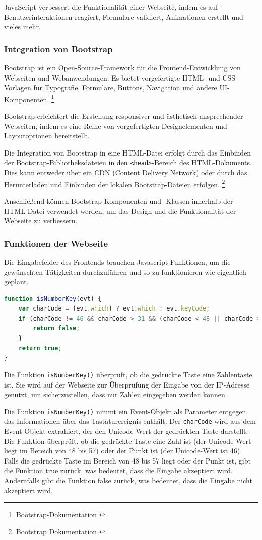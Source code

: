\begin{itemize}
JavaScript verbessert die Funktionalität einer Webseite, indem es auf Benutzerinteraktionen reagiert, Formulare validiert, Animationen erstellt und vieles mehr.

\subsubsection*{Integration von Bootstrap}
Bootstrap ist ein Open-Source-Framework für die Frontend-Entwicklung von Webseiten und Webanwendungen. Es bietet vorgefertigte HTML- und CSS-Vorlagen für Typografie, Formulare, Buttons, Navigation und andere UI-Komponenten. \footnote{Bootstrap-Dokumentation \cite{Bootstrap}}

Bootstrap erleichtert die Erstellung responsiver und ästhetisch ansprechender Webseiten, indem es eine Reihe von vorgefertigten Designelementen und Layoutoptionen bereitstellt.

Die Integration von Bootstrap in eine HTML-Datei erfolgt durch das Einbinden der Bootstrap-Bibliotheksdateien in den \texttt{<head>}-Bereich des HTML-Dokuments. Dies kann entweder über ein CDN (Content Delivery Network) oder durch das Herunterladen und Einbinden der lokalen Bootstrap-Dateien erfolgen. \footnote{Bootstrap Dokumentation \cite{CDN-Links}}

Anschließend können Bootstrap-Komponenten und -Klassen innerhalb der HTML-Datei verwendet werden, um das Design und die Funktionalität der Webseite zu verbessern.

\subsubsection{Funktionen der Webseite}
Die Eingabefelder des Frontends brauchen Javascript Funktionen, um die gewünschten Tätigkeiten durchzuführen und so zu funktionieren wie eigentlich geplant.
\begin{lstlisting}[language=JavaScript, caption={Javascript | Ueberpruefung, ob die Eingabe eine Zahl oder . ist}]
function isNumberKey(evt) {
    var charCode = (evt.which) ? evt.which : evt.keyCode;
    if (charCode != 46 && charCode > 31 && (charCode < 48 || charCode > 57)) {
        return false;
    }
    return true;
}
\end{lstlisting}
Die Funktion \texttt{isNumberKey()} überprüft, ob die gedrückte Taste eine Zahlentaste ist. Sie wird auf der Webseite zur Überprüfung der Eingabe von der IP-Adresse genutzt, um sicherzustellen, dass nur Zahlen eingegeben werden können.

Die Funktion \texttt{isNumberKey()} nimmt ein Event-Objekt als Parameter entgegen, das Informationen über das Tastaturereignis enthält. Der \texttt{charCode} wird aus dem Event-Objekt extrahiert, der den Unicode-Wert der gedrückten Taste darstellt. Die Funktion überprüft, ob die gedrückte Taste eine Zahl ist (der Unicode-Wert liegt im Bereich von 48 bis 57) oder der Punkt ist (der Unicode-Wert ist 46). Falls die gedrückte Taste im Bereich von 48 bis 57 liegt oder der Punkt ist, gibt die Funktion true zurück, was bedeutet, dass die Eingabe akzeptiert wird. Andernfalls gibt die Funktion false zurück, was bedeutet, dass die Eingabe nicht akzeptiert wird.


\end{itemize}
